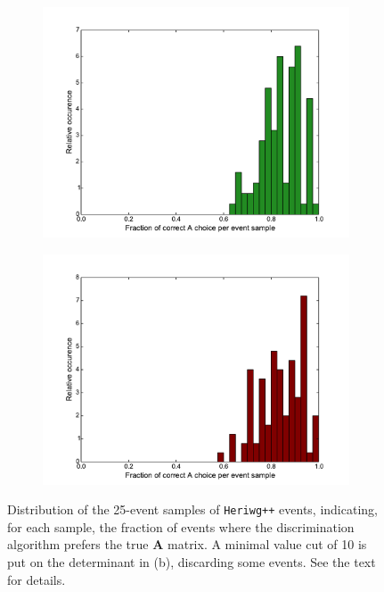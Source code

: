 \documentclass[twoside,english]{uiofysmaster}
\begin{document}
\begin{figure}[hbt]
	\centering
	\begin{subfigure}[b]{0.45\textwidth}
		\includegraphics[width=\textwidth]{figures/improving_combinatorics/histogram-pairwise_A_selection-fraction_of_corr_A-nodetAcut.pdf} 
		\caption{ }
		\label{fig:correct_A_preference_distribution_a}
	\end{subfigure}
	\begin{subfigure}[b]{0.45\textwidth}
		\includegraphics[width=\textwidth]{figures/improving_combinatorics/histogram-pairwise_A_selection-fraction_of_corr_A-detAcut10.pdf} 
		\caption{ }
		\label{fig:correct_A_preference_distribution_b}
	\end{subfigure}
	\caption{Distribution of the 25-event samples of {\tt Heriwg++} events, indicating, for each sample, the fraction of events where the discrimination algorithm prefers the true $\mathbf{A}$ matrix. A minimal value cut of 10 is put on the determinant in (b), discarding some events. See the text for details.}
	\label{fig:correct_A_preference_distribution}
\end{figure}
\end{document}
